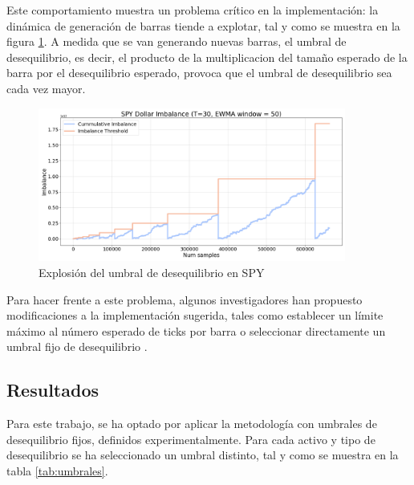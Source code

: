 \documentclass[a4paper,12pt, twoside]{report}
\begin{document}
Este comportamiento muestra un problema crítico en la implementación: la dinámica de generación de barras tiende a explotar, 
tal y como se muestra en la figura \ref{fig:explo-spy}. A medida que se van generando nuevas barras, el umbral de desequilibrio,
es decir, el producto de la multiplicacion del tamaño esperado de la barra por el desequilibrio esperado, provoca que el umbral de
desequilibrio sea cada vez mayor.

\begin{figure}[H]
    \centering
    \includegraphics[width=0.9\textwidth]{./figures/spy_volume_explo.png}
    \caption{Explosión del umbral de desequilibrio en SPY}
    \label{fig:explo-spy}
\end{figure}

Para hacer frente a este problema, algunos investigadores han propuesto modificaciones 
a la implementación sugerida, tales como establecer un límite máximo al número esperado 
de ticks por barra o seleccionar directamente un umbral fijo de desequilibrio \cite{quant_finance_stack_exchange}. 

\subsection{Resultados} \label{sec:resultado-imbalance}
Para este trabajo, se ha optado por aplicar la metodología con umbrales de desequilibrio fijos, definidos experimentalmente.
Para cada activo y tipo de desequilibrio se ha seleccionado un umbral distinto, tal y como se muestra en la tabla \ref{tab:umbrales}.
\end{document}
